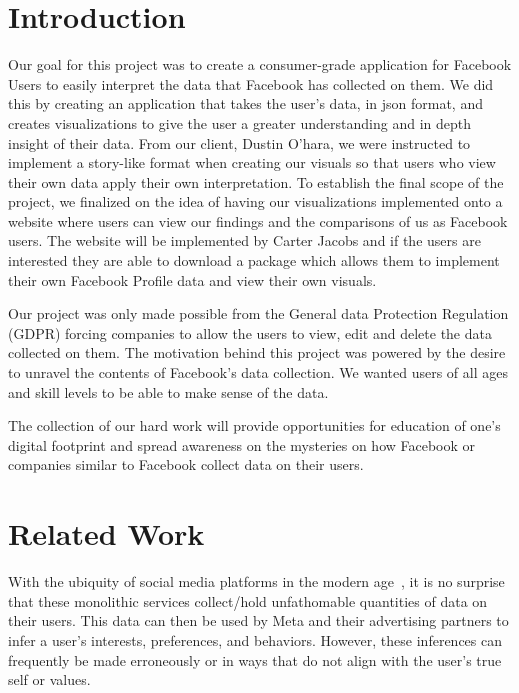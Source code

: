 \documentclass[conference, letterpaper, 11pt]{IEEEtran}
\begin{document}
\section{Introduction} \label{IN}

Our goal for this project was to create a consumer-grade application for Facebook Users to easily interpret the data that Facebook has collected on them. We did this by creating an application that takes the user’s data, in json format, and creates visualizations to give the user a greater understanding and in depth insight of their data. From our client, Dustin O’hara, we were instructed to implement a story-like format when creating our visuals so that users who view their own data apply their own interpretation. To establish the final scope of the project, we finalized on the idea of having our visualizations implemented onto a website where users can view our findings and the comparisons of us as Facebook users. The website will be implemented by Carter Jacobs and if the users are interested they are able to download a package which allows them to implement their own Facebook Profile data and view their own visuals. 

Our project was only made possible from the General data Protection Regulation (GDPR) forcing companies to allow the users to view, edit and delete the data collected on them. The motivation behind this project was powered by the desire to unravel the contents of Facebook’s data collection. We wanted users of all ages and skill levels to be able to make sense of the data. 

The collection of our hard work will provide opportunities for education of one's digital footprint and spread awareness on the mysteries on how Facebook or companies similar to Facebook collect data on their users. 

\section{Related Work} \label{RW}

With the ubiquity of social media platforms in the modern age~\cite{metapress}, it is no surprise that these monolithic services collect/hold unfathomable quantities of data on their users. This data can then be used by Meta and their advertising partners to infer a user's interests, preferences, and behaviors. However, these inferences can frequently be made erroneously or in ways that do not align with the user's true self or values.
\end{document}

